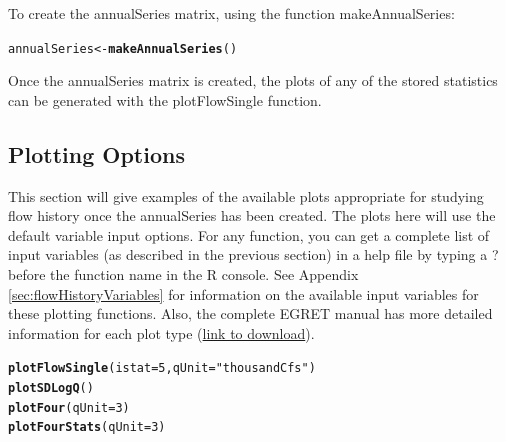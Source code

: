 \documentclass[a4paper,11pt]{article}\usepackage{graphicx, color}
\makeatletter
\newcommand{\hlfunctioncall}[1]{\textcolor[rgb]{0.501960784313725,0,0.329411764705882}{\textbf{#1}}}%
\newcommand{\hlstring}[1]{\textcolor[rgb]{0.6,0.6,1}{#1}}%
\newenvironment{kframe}{%
 \def\at@end@of@kframe{}%
 \ifinner\ifhmode%
  \def\at@end@of@kframe{\end{minipage}}%
  \begin{minipage}{\columnwidth}%
 \fi\fi%
 \def\FrameCommand##1{\hskip\@totalleftmargin \hskip-\fboxsep
 \colorbox{shadecolor}{##1}\hskip-\fboxsep
     \hskip-\linewidth \hskip-\@totalleftmargin \hskip\columnwidth}%
 \MakeFramed {\advance\hsize-\width
   \@totalleftmargin\z@ \linewidth\hsize
   \@setminipage}}%
 {\par\unskip\endMakeFramed%
 \at@end@of@kframe}
\newenvironment{knitrout}{}{} %
\makeatother
\begin{document}
To create the annualSeries matrix, using the function makeAnnualSeries:
\begin{knitrout}
\color{fgcolor}\begin{kframe}
\begin{alltt}
annualSeries <- \hlfunctioncall{makeAnnualSeries}()
\end{alltt}
\end{kframe}
\end{knitrout}


Once the annualSeries matrix is created, the plots of any of the stored statistics can be generated with the plotFlowSingle function.

\subsection{Plotting Options}
\label{sec:plotOptions}
This section will give examples of the available plots appropriate for studying flow history once the annualSeries has been created. The plots here will use the default variable input options.  For any function, you can get a complete list of input variables (as described in the previous section) in a help file by typing a ? before the function name in the R console. See Appendix \ref{sec:flowHistoryVariables} for information on the available input variables for these plotting functions. Also, the complete EGRET manual has more detailed information for each plot type (\href{https://github.com/USGS-R/EGRET/raw/Documentation/EGRET%2Bmanual_4.doc}{link to download}).

\begin{knitrout}
\color{fgcolor}\begin{kframe}
\begin{alltt}
\hlfunctioncall{plotFlowSingle}(istat=5,qUnit=\hlstring{"thousandCfs"})
\hlfunctioncall{plotSDLogQ}()
\hlfunctioncall{plotFour}(qUnit=3)
\hlfunctioncall{plotFourStats}(qUnit=3)
\end{alltt}
\end{kframe}
\end{knitrout}
\end{document}
